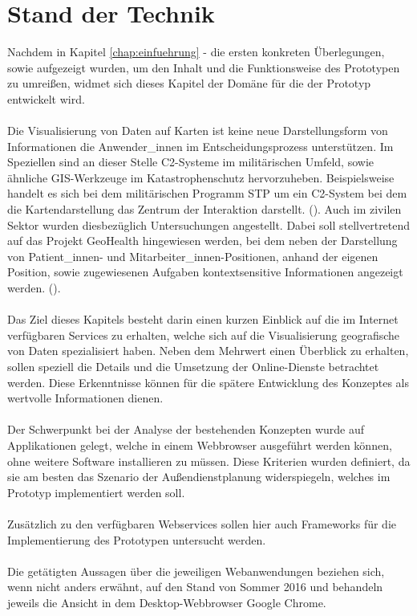 \documentclass[../Bachelorarbeit.tex]{subfiles}
\begin{document}
\chapter{Stand der Technik}
\label{chap:analyse}

Nachdem in Kapitel \ref{chap:einfuehrung} -  die ersten konkreten Überlegungen, sowie  aufgezeigt wurden, um den Inhalt und die Funktionsweise des Prototypen zu umreißen, widmet sich dieses Kapitel der Domäne für die der Prototyp entwickelt wird.\\
\\
Die Visualisierung von Daten auf Karten ist keine neue Darstellungsform von Informationen die Anwender\_innen im Entscheidungsprozess unterstützen. 
Im Speziellen sind an dieser Stelle \ac{C2}-Systeme im militärischen Umfeld,  sowie ähnliche \ac{GIS}-Werkzeuge im Katastrophenschutz hervorzuheben.
Beispielsweise handelt es sich bei dem militärischen Programm \ac{STP} um ein \ac{C2}-System bei dem die Kartendarstellung das Zentrum der Interaktion darstellt. (\cite[vgl.][]{SketchThruPlan}). 
Auch im zivilen Sektor wurden diesbezüglich Untersuchungen angestellt. 
Dabei soll stellvertretend auf das Projekt GeoHealth hingewiesen werden, bei dem neben der Darstellung von Patient\_innen- und Mitarbeiter\_innen-Positionen, anhand der eigenen Position, sowie zugewiesenen Aufgaben kontextsensitive Informationen angezeigt werden. (\cite[vgl.][]{GeoHealth}).\\
\\
Das Ziel dieses Kapitels besteht darin einen kurzen Einblick auf die im Internet verfügbaren Services zu erhalten, welche sich auf die Visualisierung geografische von Daten spezialisiert haben. 
Neben dem Mehrwert einen Überblick  zu erhalten, sollen speziell die Details und die Umsetzung der Online-Dienste betrachtet werden.
Diese Erkenntnisse können für die spätere Entwicklung  des Konzeptes als wertvolle Informationen dienen.\\
\\
Der Schwerpunkt bei der Analyse der bestehenden Konzepten wurde auf Applikationen gelegt, welche in einem Webbrowser ausgeführt werden können, ohne weitere Software installieren zu müssen.
Diese Kriterien wurden definiert, da sie am besten das Szenario der Außendienstplanung widerspiegeln, welches im Prototyp implementiert werden soll.\\
\\
Zusätzlich zu den verfügbaren Webservices sollen hier auch Frameworks für die Implementierung des Prototypen untersucht werden. \\
\\
Die getätigten Aussagen über die jeweiligen Webanwendungen beziehen sich, wenn nicht anders erwähnt, auf den Stand von Sommer 2016 und behandeln jeweils die Ansicht in dem Desktop-Webbrowser Google Chrome.
\end{document}
